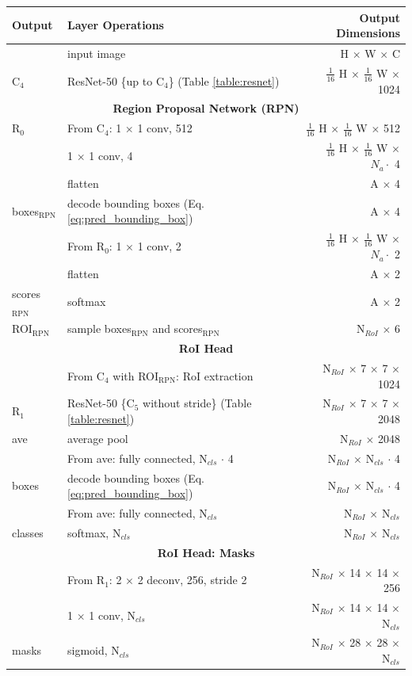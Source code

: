 {
\begin{longtable}{llr}
\toprule
\textbf{Output} & \textbf{Layer Operations} & \textbf{Output Dimensions} \\
\midrule\midrule
& input image & H $\times$ W $\times$ C \\
\midrule
C$_4$ & ResNet-50 \{up to C$_4$\} (Table \ref{table:resnet})  & $\tfrac{1}{16}$ H $\times$ $\tfrac{1}{16}$ W $\times$ 1024 \\
\midrule
\multicolumn{3}{c}{\textbf{Region Proposal Network (RPN)}}\\
\midrule
R$_0$ & From C$_4$: 1 $\times$ 1 conv, 512 & $\tfrac{1}{16}$ H $\times$ $\tfrac{1}{16}$ W $\times$ 512 \\
& 1 $\times$ 1 conv, 4 & $\tfrac{1}{16}$ H $\times$ $\tfrac{1}{16}$ W $\times$ $N_a \cdot$ 4 \\
& flatten & A $\times$ 4 \\
boxes$_{\mathrm{RPN}}$ & decode bounding boxes (Eq. \ref{eq:pred_bounding_box}) & A $\times$ 4\\
& From R$_0$: 1 $\times$ 1 conv, 2 & $\tfrac{1}{16}$ H $\times$ $\tfrac{1}{16}$ W $\times$ $N_a \cdot$ 2 \\
& flatten & A $\times$ 2 \\
scores$_{\mathrm{RPN}}$& softmax & A $\times$ 2 \\
ROI$_{\mathrm{RPN}}$ & sample boxes$_{\mathrm{RPN}}$ and scores$_{\mathrm{RPN}}$ & N$_{RoI}$ $\times$ 6 \\
\midrule
\multicolumn{3}{c}{\textbf{RoI Head}}\\
\midrule
& From C$_4$ with ROI$_{\mathrm{RPN}}$: RoI extraction & N$_{RoI}$ $\times$ 7 $\times$ 7 $\times$ 1024 \\
R$_1$& ResNet-50 \{C$_5$ without stride\} (Table \ref{table:resnet})  & N$_{RoI}$ $\times$ 7 $\times$ 7 $\times$ 2048 \\
ave & average pool & N$_{RoI}$ $\times$ 2048 \\
& From ave: fully connected, N$_{cls}$ $\cdot$ 4 & N$_{RoI}$ $\times$ N$_{cls}$ $\cdot$ 4\\
boxes & decode bounding boxes (Eq. \ref{eq:pred_bounding_box}) & N$_{RoI}$ $\times$ N$_{cls}$ $\cdot$ 4\\
& From ave: fully connected, N$_{cls}$ & N$_{RoI}$ $\times$ N$_{cls}$ \\
classes& softmax, N$_{cls}$ & N$_{RoI}$ $\times$ N$_{cls}$ \\
\midrule
\multicolumn{3}{c}{\textbf{RoI Head: Masks}}\\
\midrule
& From R$_1$: 2 $\times$ 2 deconv, 256, stride 2 & N$_{RoI}$ $\times$ 14 $\times$ 14 $\times$ 256 \\
& 1 $\times$ 1 conv, N$_{cls}$ & N$_{RoI}$ $\times$ 14 $\times$ 14 $\times$ N$_{cls}$ \\
masks & sigmoid, N$_{cls}$ & N$_{RoI}$ $\times$ 28 $\times$ 28 $\times$ N$_{cls}$ \\


\end{longtable}}

